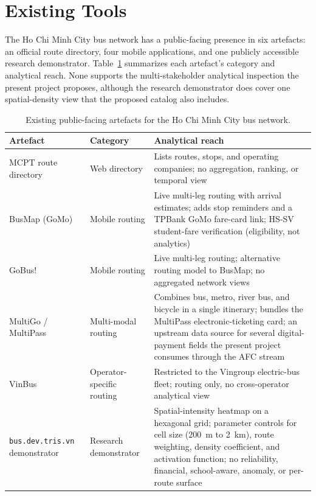 \section{Existing Tools}
\label{sec:related:tools}

The Ho Chi Minh City bus network has a public-facing presence in six
artefacts: an official route directory, four mobile applications, and
one publicly accessible research demonstrator.
Table~\ref{tab:related:tools} summarizes each artefact's category and
analytical reach.
None supports the multi-stakeholder analytical inspection the present
project proposes, although the research demonstrator does cover one
spatial-density view that the proposed catalog also includes.

\begin{table}[!htbp]
  \centering
  \caption{Existing public-facing artefacts for the Ho Chi Minh City bus network.}
  \label{tab:related:tools}
  \footnotesize
  \renewcommand{\arraystretch}{1.3}
  \begin{tabularx}{\linewidth}{p{2.5cm} p{2.8cm} X}
    \hline
    \textbf{Artefact} & \textbf{Category} & \textbf{Analytical reach} \\
    \hline
    MCPT route directory~\cite{mcptDirectory}     & Web directory             & Lists routes, stops, and operating companies; no aggregation, ranking, or temporal view \\
    BusMap (GoMo)~\cite{busmap}                   & Mobile routing            & Live multi-leg routing with arrival estimates; adds stop reminders and a TPBank GoMo fare-card link; HS-SV student-fare verification (eligibility, not analytics) \\
    GoBus! \cite{gobus}                           & Mobile routing            & Live multi-leg routing; alternative routing model to BusMap; no aggregated network views \\
    MultiGo / MultiPass~\cite{multigo}            & Multi-modal routing       & Combines bus, metro, river bus, and bicycle in a single itinerary; bundles the MultiPass electronic-ticketing card; an upstream data source for several digital-payment fields the present project consumes through the AFC stream \\
    VinBus~\cite{vinbus}                          & Operator-specific routing & Restricted to the Vingroup electric-bus fleet; routing only, no cross-operator analytical view \\
    \texttt{bus.dev.tris.vn} demonstrator         & Research demonstrator     & Spatial-intensity heatmap on a hexagonal grid; parameter controls for cell size (200~m to 2~km), route weighting, density coefficient, and activation function; no reliability, financial, school-aware, anomaly, or per-route surface \\
    \hline
  \end{tabularx}
\end{table}

